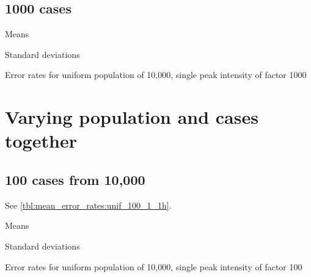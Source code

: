 \subsection{1000 cases}
\begin{table}[H]
\centering
\scriptsize

    \begin{subtable}{0.5\textwidth}
    
    \caption{Means} 
    \end{subtable}%
    \begin{subtable}{0.5\textwidth}
    
    \caption{Standard deviations} 
    \end{subtable}

\caption{Error rates for uniform population of 10,000, single peak intensity of factor 1000}
\label{tbl:mean_error_rates:unif_1000_1_1h}
\end{table}


\section{Varying population and cases together}

\subsection{100 cases from 10,000}

See \autoref{tbl:mean_error_rates:unif_100_1_1h}.

\begin{table}[H]
\centering
\scriptsize

    \begin{subtable}{0.5\textwidth}
    
    \caption{Means} 
    \end{subtable}%
    \begin{subtable}{0.5\textwidth}
    
    \caption{Standard deviations} 
    \end{subtable}

\caption{Error rates for uniform population of 10,000, single peak intensity of factor 100}
\label{tbl:mean_error_rates:unif_100_1_1h:2}
\end{table}

